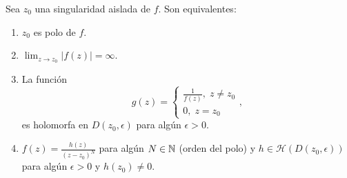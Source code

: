 \begin{theorem}
Sea $\displaystyle z_{0} $ una singularidad aislada de $\displaystyle f $. Son equivalentes:
\begin{enumerate}
\item $\displaystyle z_{0} $ es polo de $\displaystyle f $. 
\item $\displaystyle \lim_{z \to z_{0}} \left|f\left(z\right)\right|=\infty  $.
\item La función 
	\[g\left(z\right)=
	\begin{cases}
	\frac{1}{f\left(z\right)}, \; z \neq z_{0} \\
	0, \; z = z_{0}
	\end{cases}
	,\]
	es holomorfa en $\displaystyle D\left(z_{0}, \epsilon \right) $ para algún $\displaystyle \epsilon > 0 $. 
\item $\displaystyle f\left(z\right)=\frac{h\left(z\right)}{\left(z-z_{0}\right)^{N}} $ para algún $\displaystyle N \in \mathbb{N} $ (orden del polo) y $\displaystyle h \in \mathcal{H}\left(D\left(z_{0}, \epsilon \right)\right) $ para algún $\displaystyle \epsilon > 0 $ y $\displaystyle h\left(z_{0}\right)\neq 0 $.
\end{enumerate}
\end{theorem}
